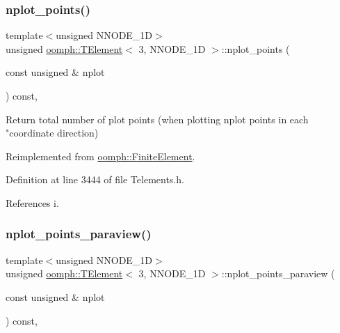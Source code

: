 \subsubsection{\texorpdfstring{nplot\+\_\+points()}{nplot\_points()}}
{\footnotesize\ttfamily template$<$unsigned N\+N\+O\+D\+E\+\_\+1D$>$ \\
unsigned \hyperlink{classoomph_1_1TElement}{oomph\+::\+T\+Element}$<$ 3, N\+N\+O\+D\+E\+\_\+1D $>$\+::nplot\+\_\+points (\begin{DoxyParamCaption}\item[{const unsigned \&}]{nplot }\end{DoxyParamCaption}) const\hspace{0.3cm}{\ttfamily [inline]}, {\ttfamily [virtual]}}



Return total number of plot points (when plotting nplot points in each "coordinate direction) 



Reimplemented from \hyperlink{classoomph_1_1FiniteElement_a8ed563c7ff0cfd8bafdbb0132b388106}{oomph\+::\+Finite\+Element}.



Definition at line 3444 of file Telements.\+h.



References i.

\mbox{\label{classoomph_1_1TElement_3_013_00_01NNODE__1D_01_4_a72f7a233f0c5c93b8c39fd68e1526d33}} 
\subsubsection{\texorpdfstring{nplot\+\_\+points\+\_\+paraview()}{nplot\_points\_paraview()}}
{\footnotesize\ttfamily template$<$unsigned N\+N\+O\+D\+E\+\_\+1D$>$ \\
unsigned \hyperlink{classoomph_1_1TElement}{oomph\+::\+T\+Element}$<$ 3, N\+N\+O\+D\+E\+\_\+1D $>$\+::nplot\+\_\+points\+\_\+paraview (\begin{DoxyParamCaption}\item[{const unsigned \&}]{nplot }\end{DoxyParamCaption}) const\hspace{0.3cm}{\ttfamily [inline]}, {\ttfamily [virtual]}}



